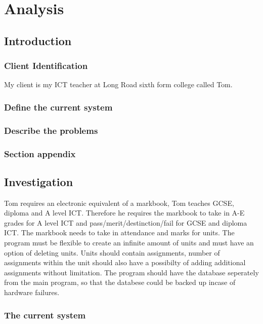 \chapter{Analysis}

\section{Introduction}

\subsection{Client Identification} 
My client is my ICT teacher at Long Road
sixth form college called Tom. 

\subsection{Define the current system}

\subsection{Describe the problems}

\subsection{Section appendix}

\section{Investigation}
Tom requires an electronic equivalent of a
markbook, Tom teaches GCSE, diploma and A level ICT. Therefore he requires the
markbook to take in A-E grades for A level ICT and pass/merit/destinction/fail for GCSE and diploma ICT. The markbook needs to take
in attendance and marks for units. The program must be flexible to create an
infinite amount of units and must have an option of deleting units. Units should
contain assignments, number of assignments within the unit should also have a
possibilty of adding additional assignments without limitation. The program should have the database seperately from the main program, 
so that the databese could be backed up incase of hardware failures.

\subsection{The current system}

